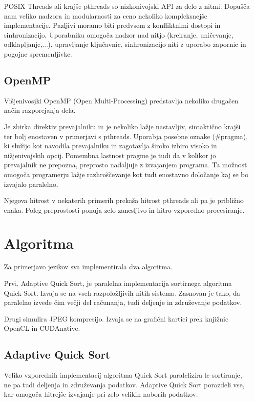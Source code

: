 \documentclass[journal,a4paper,twoside]{sty/IEEEtran}
\begin{document}
POSIX Threads ali krajše pthreads so nizkonivojski API za delo z nitmi.
Dopušča nam veliko nadzora in modularnosti za ceno nekoliko kompleksnejše implementacije.
Pazljivi moramo biti predvsem z konfliktnimi dostopi in sinhronizacijo.
Uporabniku omogoča nadzor nad nitjo (kreiranje, uničevanje, odklapljanje,...), upravljanje ključavnic, sinhronizacijo niti z uporabo zapornic in pogojne
	spremenljivke.

\subsection{OpenMP}

Višjenivosjki OpenMP (Open Multi-Processing) predstavlja nekoliko drugačen način razporejanja dela.

Je zbirka direktiv prevajalniku in je nekoliko lažje nastavljiv, sintaktično krajši ter bolj enostaven v primerjavi s pthreads.
Uporabja posebne oznake (\#pragma), ki služijo kot navodila prevajalniku in zagotavlja široko izbiro visoko in nižjenivojskih opcij.
Pomembna lastnost pragme je tudi da v kolikor jo prevajalnik ne prepozna, preprosto nadaljuje z izvajanjem programa. Ta možnost 
omogoča programerju lažje razhroščevanje kot tudi enostavno določanje kaj se bo izvajalo paralelno. 




Njegova hitrost v nekaterih primerih prekaša hitrost pthreads ali pa je približno enaka. Poleg preprostosti ponuja zelo zanesljivo in hitro vzporedno procesiranje.

\section{Algoritma}
Za primerjavo jezikov sva implementirala dva algoritma.

Prvi, Adaptive Quick Sort, je paralelna implementacija sortirnega algoritma Quick Sort.
Izvaja se na vseh razpoložljivih nitih sistema.
Zasnovan je tako, da paralelno izvede čim večji del računanja, tudi deljenje in združevanje podatkov.

Drugi simulira JPEG kompresijo.
Izvaja se na grafični kartici prek knjižnic OpenCL in CUDAnative.

\subsection{Adaptive Quick Sort}

Veliko vzporednih implementacij algoritma Quick Sort paralelizira le sortiranje, ne pa tudi deljenja in združevanja podatkov.
Adaptive Quick Sort porazdeli vse, kar omogoča hitrejše izvajanje pri zelo velikih naborih podatkov.
\end{document}
